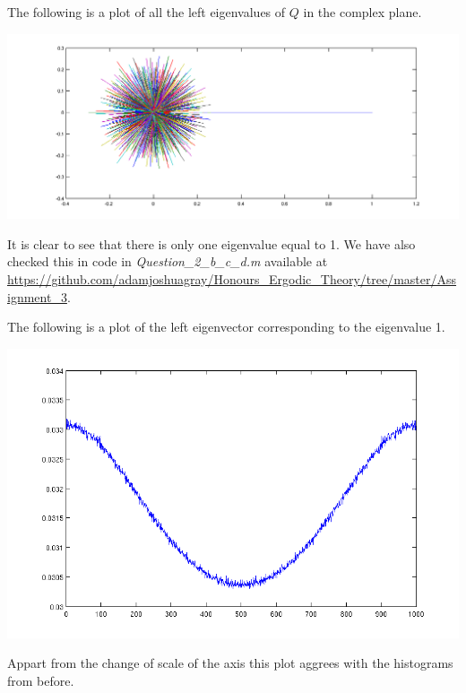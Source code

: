 \documentclass{unswmaths}
\begin{document}
\subsection{}
The following is a plot of all the left eigenvalues of $ Q $ in the complex plane. 


\includegraphics[scale=0.4]{qn_2_eigenvalues}


It is clear to see that there is only one eigenvalue equal to 1. We have also checked this in code in \emph{Question\_2\_b\_c\_d.m} available at \url{https://github.com/adamjoshuagray/Honours_Ergodic_Theory/tree/master/Assignment_3}.

The following is a plot of the left eigenvector corresponding to the eigenvalue 1.

\includegraphics[scale=0.5]{qn_2_d_stationary}

Appart from the change of scale of the axis this plot aggrees with the histograms from before.

\section{}
\subsection{}
\end{document}
